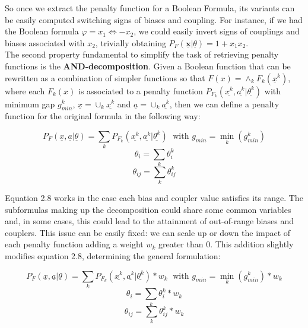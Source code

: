 So once we extract the penalty function for a Boolean Formula, its variants can be easily computed switching signs of biases and coupling. For instance, if we had the Boolean formula $\varphi = x_1 \iff -x_2$, we could easily invert signs of couplings and biases associated with $x_2$, trivially obtaining $P_F(\underline{\textbf{x}} | \underline{\theta}) = 1 + x_1x_2$. \\
The second property fundamental to simplify the task of retrieving penalty functions is the \textbf{AND-decomposition}. Given a Boolean function that can be rewritten as a combination of simpler functions so that $F(x) = \land_k F_k(\underline{x}^k)$, where each $F_k(x)$ is associated to a penalty function $P_{F_k}(\underline{x^k},\underline{a^k}|\underline{\theta^k})$ with minimum gap $g^k_{min}$, $\underline{x} = \cup_k \underline{x^k}$ and $\underline{a} = \cup_k \underline{a^k}$, then we can define a penalty function for the original formula in the following way:

\begin{equation*}
    P_{F}(\underline{x},\underline{a}|\underline{\theta}) = \sum_k P_{F_k}(\underline{x^k},\underline{a^k}|\underline{\theta^k}) \; \textrm{        with        } g_{min} = \min_k(g^k_{min})
\end{equation*}
\begin{equation}
    \theta_i = \sum_k \theta^k_i
\end{equation}
\begin{equation*}
    \theta_{ij} = \sum_k \theta^k_{ij}
\end{equation*}

Equation 2.8 works in the case each bias and coupler value satisfies its range. The subformulas making up the decomposition could share some common variables and, in some cases, this could lead to the attainment of out-of-range biases and couplers. This issue can be easily fixed: we can scale up or down the impact of each penalty function adding a weight $w_k$ greater than 0. This addition slightly modifies equation 2.8, determining the general formulation:

\begin{equation*}
    P_{F}(\underline{x},\underline{a}|\underline{\theta}) = \sum_k P_{F_k}(\underline{x^k},\underline{a^k}|\underline{\theta^k})*w_k \; \textrm{        with        } g_{min} = \min_k(g^k_{min})*w_k
\end{equation*}
\begin{equation}
    \theta_i = \sum_k \theta^k_i*w_k
\end{equation}
\begin{equation*}
    \theta_{ij} = \sum_k \theta^k_{ij}*w_k
\end{equation*}

